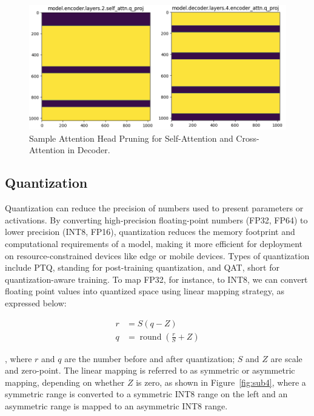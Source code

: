 \begin{figure}[h!]
    \centering
    \includegraphics[width=0.9\linewidth]{images/pruning2}
    \caption{Sample Attention Head Pruning for Self-Attention and Cross-Attention in Decoder.}
    \label{fig:attention_head_pruning}
\end{figure}


\subsection{Quantization}
Quantization can reduce the precision of numbers used to present parameters or activations. By converting high-precision floating-point numbers (FP32, FP64) to lower precision (INT8, FP16), quantization reduces the memory footprint and computational requirements of a model, making it more efficient for deployment on resource-constrained devices like edge or mobile devices. Types of quantization include PTQ, standing for post-training quantization, and QAT, short for quantization-aware training. To map FP32, for instance, to INT8, we can convert floating point values into quantized space using linear mapping strategy, as expressed below:


\begin{align}
    r &= S(q-Z) \\
    q &= \operatorname{round}\left(\frac{r}{S} + Z\right)
\end{align}

, where $r$ and $q$ are the number before and after quantization; $S$ and $Z$ are scale and zero-point. The linear mapping is referred to as symmetric or asymmetric mapping, depending on whether $Z$ is zero, as shown in Figure~\ref{fig:sub4}, where a symmetric range is converted to a symmetric INT8 range on the left and an asymmetric range is mapped to an asymmetric INT8 range.

